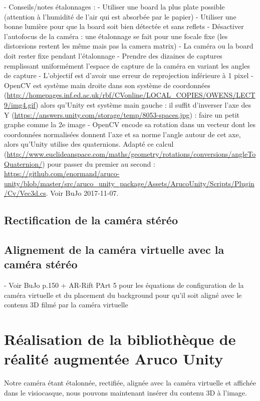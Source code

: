 - Conseils/notes étalonnages :
  - Utiliser une board la plus plate possible (attention à l'humidité de l'air qui est absorbée par le papier)
  - Utiliser une bonne lumière pour que la board soit bien détectée et sans reflets
  - Désactiver l'autofocus de la caméra : une étalonnage se fait pour une focale fixe (les distorsions restent les même mais pas la camera matrix)
  - La caméra ou la board doit rester fixe pendant l'étalonnage
  - Prendre des dizaines de captures remplissant uniformément l'espace de capture de la caméra en variant les angles de capture
  - L'objectif est d'avoir une erreur de reprojection inférieure à 1 pixel
  - OpenCV est système main droite dans son système de coordonnées (\url{http://homepages.inf.ed.ac.uk/rbf/CVonline/LOCAL_COPIES/OWENS/LECT9/img4.gif}) alors qu'Unity est système main gauche : il suffit d'inverser l'axe des Y (\url{https://answers.unity.com/storage/temp/8053-spaces.jpg}) : faire un petit graphe comme la 2e image
  - OpenCV encode sa rotation dans un vecteur dont les coordonnées normalisées donnent l'axe et sa norme l'angle autour de cet axe, alors qu'Unity utilise des quaternions. Adapté ce calcul (\url{http://www.euclideanspace.com/maths/geometry/rotations/conversions/angleToQuaternion/}) pour passer du premier au second : \url{https://github.com/enormand/aruco-unity/blob/master/src/aruco_unity_package/Assets/ArucoUnity/Scripts/Plugin/Cv/Vec3d.cs}. Voir BuJo 2017-11-07.

\subsection{Rectification de la caméra stéréo}

\subsection{Alignement de la caméra virtuelle avec la caméra stéréo}
- Voir BuJo p.150 + AR-Rift PArt 5 pour les équations de configuration de la caméra virtuelle et du placement du background pour qu'il soit aligné avec le contenu 3D filmé par la caméra virtuelle


\section{Réalisation de la bibliothèque de réalité augmentée Aruco Unity}
\label{sec:aruco_unity}

Notre caméra étant étalonnée, rectifiée, alignée avec la caméra virtuelle et affichée dans le visiocasque, nous pouvons maintenant insérer du contenu 3D à l'image.

